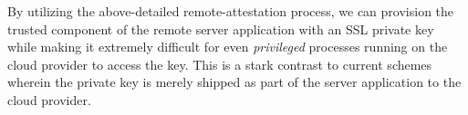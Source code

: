 \documentclass[../../main.tex]{subfiles}
\begin{document}
By utilizing the above-detailed remote-attestation process, we can
provision the trusted component of the remote server application with
an SSL private key while making it extremely difficult for even
\textit{privileged} processes running on the cloud provider to access
the key. This is a stark contrast to current schemes wherein the
private key is merely shipped as part of the server application to the
cloud provider.
\end{document}
